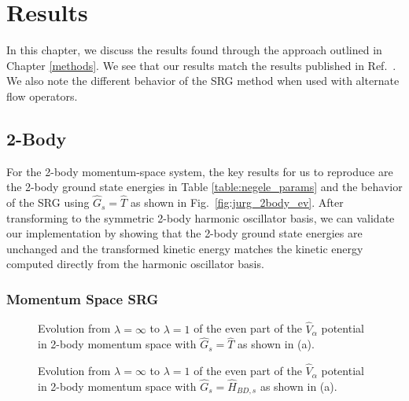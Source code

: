 \chapter{Results}\label{results}

In this chapter, we discuss the results found through the approach outlined in Chapter \ref{methods}. We see that our results match the results published in Ref.~\cite{Jurgenson:2008jp}. We also note the different behavior of the SRG method when used with alternate flow operators.

\section{2-Body}

For the 2-body momentum-space system, the key results for us to reproduce are the 2-body ground state energies in Table \ref{table:negele_params} and the behavior of the SRG using $\hat{G}_s=\hat{T}$ as shown in Fig.~\ref{fig:jurg_2body_ev}. After transforming to the symmetric 2-body harmonic oscillator basis, we can validate our implementation by showing that the 2-body ground state energies are unchanged and the transformed kinetic energy matches the kinetic energy computed directly from the harmonic oscillator basis.

\subsection{Momentum Space SRG}

\begin{figure}[th!]
\begin{center}
\end{center}
\caption{Evolution from $\lambda=\infty$ to $\lambda=1$ of the even part of the $\hat{V}_\alpha$ potential in 2-body momentum space with $\hat{G}_s=\hat{T}$ as shown in (a).}
\label{fig:2body_T_full}
\end{figure}

\begin{figure}[th!]
\begin{center}
\end{center}
\caption{Evolution from $\lambda=\infty$ to $\lambda=1$ of the even part of the $\hat{V}_\alpha$ potential in 2-body momentum space with $\hat{G}_s=\hat{H}_{BD, s}$ as shown in (a).}
\label{fig:2body_BD_full}
\end{figure}

